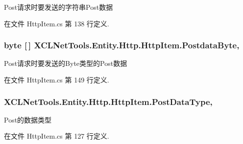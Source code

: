 Post请求时要发送的字符串\-Post数据 



在文件 Http\-Item.\-cs 第 138 行定义.

\hypertarget{class_x_c_l_net_tools_1_1_entity_1_1_http_1_1_http_item_a49b2ba8771878dab0de105397ebc69de}{
\subsubsection[{Postdata\-Byte}]{\setlength{\rightskip}{0pt plus 5cm}byte \mbox{[}$\,$\mbox{]} X\-C\-L\-Net\-Tools.\-Entity.\-Http.\-Http\-Item.\-Postdata\-Byte\hspace{0.3cm}{\ttfamily [get]}, {\ttfamily [set]}}}\label{class_x_c_l_net_tools_1_1_entity_1_1_http_1_1_http_item_a49b2ba8771878dab0de105397ebc69de}


Post请求时要发送的\-Byte类型的\-Post数据 



在文件 Http\-Item.\-cs 第 149 行定义.

\hypertarget{class_x_c_l_net_tools_1_1_entity_1_1_http_1_1_http_item_a4b06cbf69ce5d07151aa768f00bccdf2}{
\subsubsection[{Post\-Data\-Type}]{ X\-C\-L\-Net\-Tools.\-Entity.\-Http.\-Http\-Item.\-Post\-Data\-Type\hspace{0.3cm}{\ttfamily [get]}, {\ttfamily [set]}}}\label{class_x_c_l_net_tools_1_1_entity_1_1_http_1_1_http_item_a4b06cbf69ce5d07151aa768f00bccdf2}


Post的数据类型 



在文件 Http\-Item.\-cs 第 127 行定义.

